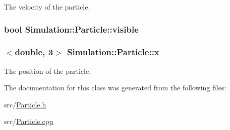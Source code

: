 The velocity of the particle. 

\hypertarget{classSimulation_1_1Particle_a20e56ab0bd4071b5cb479775742f2cfe}{
\subsubsection[{visible}]{\setlength{\rightskip}{0pt plus 5cm}bool Simulation\-::\-Particle\-::visible\hspace{0.3cm}{\ttfamily [private]}}}\label{classSimulation_1_1Particle_a20e56ab0bd4071b5cb479775742f2cfe}
\hypertarget{classSimulation_1_1Particle_a37114cf327ef0591939f157489434bde}{
\subsubsection[{x}]{$<$double, 3$>$ Simulation\-::\-Particle\-::x\hspace{0.3cm}{\ttfamily [private]}}}\label{classSimulation_1_1Particle_a37114cf327ef0591939f157489434bde}


The position of the particle. 



The documentation for this class was generated from the following files\-:\begin{DoxyCompactItemize}
\item 
src/\hyperlink{Particle_8h}{Particle.\-h}\item 
src/\hyperlink{Particle_8cpp}{Particle.\-cpp}\end{DoxyCompactItemize}
